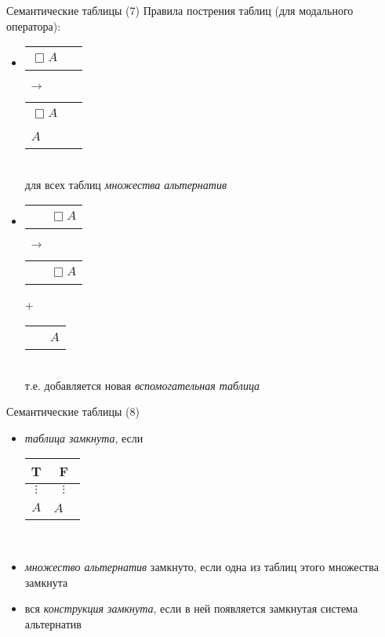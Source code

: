 \documentclass{beamer}
\begin{document}
\begin{frame}{Семантические таблицы (7)}
Правила пострения таблиц (для модального оператора):\\
\bigskip
\begin{itemize}
  \item 
      \begin{tabular}{p{0.75cm}|p{0.75cm}}
        \hline
        $\Box A$ & ~ \\
      \end{tabular}
      $\; \to \;$
      \begin{tabular}{p{0.75cm}|p{0.75cm}}
        \hline
        $\Box A$ & ~ \\
        $A$ & ~ \\
      \end{tabular}\\
      \bigskip
      {\scriptsize для всех таблиц \textit{множества альтернатив}}\\
      \bigskip
  \item 
      \begin{tabular}{p{0.75cm}|p{0.75cm}}
        \hline
        ~ & $\Box A$ \\
      \end{tabular}
      $\; \to \;$
      \begin{tabular}{p{0.75cm}|p{0.75cm}}
        \hline
        ~ & $\Box A$ \\
      \end{tabular} +
      \begin{tabular}{p{0.75cm}|p{0.75cm}}
        \hline
        ~ & $A$ \\
      \end{tabular}\\
      \bigskip
      {\scriptsize т.е. добавляется новая \textit{вспомогательная таблица}}\\
\end{itemize}
\end{frame}

\begin{frame}{Семантические таблицы (8)}
\begin{itemize}
  \item \textit{таблица замкнута}, если
      \begin{tabular}{c|c}
        T & F \\ \hline
        $\vdots$ & $\vdots$ \\
        $A$ & $A$ ~ \\
      \end{tabular}\\
      \bigskip
  \item \textit{множество альтернатив} замкнуто, если одна из таблиц этого множества замкнута
  \item вся \textit{конструкция замкнута}, если в ней появляется замкнутая система альтернатив
\end{itemize}
\end{frame}
\end{document}
